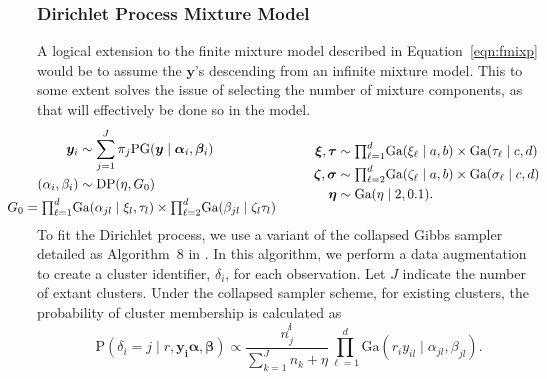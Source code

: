 \subsubsection{Dirichlet Process Mixture Model}
A logical extension to the finite mixture model described in Equation~\ref{eqn:fmixp} would be to assume the
  $\bm{ y}$'s descending from an infinite mixture model.  This to some extent solves the issue of
  selecting the number of mixture components, as that will effectively be done so in the model.
  \begin{equation}
    \label{eqn:infmixp}
    \begin{aligned}
      \bm{ y}_i &\sim \sum_{j = 1}^J\pi_j\text{PG}\left(\bm{ y}\mid \bm{ \alpha}_i, \bm{ \beta}_i\right)\\
      (\alpha_i,\beta_i) &\sim \text{DP}\left(\eta, G_0\right)\\
      &~\hspace{-2cm}G_0 = {\textstyle\prod}_{\ell = 1}^d\text{Ga}\left(\alpha_{jl}\mid\xi_{l},\tau_{l}\right)
                    \times{\textstyle\prod}_{\ell = 2}^d\text{Ga}\left(\beta_{jl}\mid\zeta_{l}\tau_{l}\right)
    \end{aligned}
    \hspace{1cm}
    \begin{aligned}
      \bm{ \xi},\bm{ \tau} &\sim {\textstyle \prod}_{\ell = 1}^d \text{Ga}(\xi_{\ell}\mid a,b)\times \text{Ga}(\tau_{\ell}\mid c,d)\\
      \bm{ \zeta},\bm{\sigma} &\sim {\textstyle\prod}_{\ell = 2}^d\text{Ga}(\zeta_{\ell} \mid a,b)\times \text{Ga}(\sigma_{\ell}\mid c,d)\\
      \bm{ \eta} &\sim \text{Ga}(\eta \mid 2, 0.1).
    \end{aligned}
  \end{equation}
  To fit the Dirichlet process, we use a variant of the collapsed Gibbs sampler detailed as
  Algorithm~8 in \citet{neal2000}.  In this algorithm, we perform a data augmentation to create a
  cluster identifier, $\delta_i$, for each observation. Let $J$ indicate the number of extant clusters.
  Under the collapsed sampler scheme, for existing clusters, the probability of cluster membership is
  calculated as
  \begin{equation}
    \label{eqn:dpdelta}
    \text{P}\left(\delta_i = j\mid r, \bm{ y_i} \bm{ \alpha}, \bm{ \beta}\right) \propto
        \frac{n_j^{\not i}}{\sum_{k = 1}^{J} n_k + \eta}
        {\textstyle\prod}_{\ell = 1}^d\text{Ga}\left(r_iy_{il}\mid\alpha_{jl},\beta_{jl}\right).
  \end{equation}
